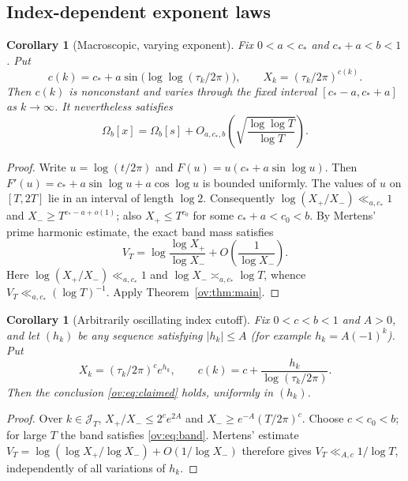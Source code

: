 \documentclass[11pt,reqno]{amsart}
\numberwithin{equation}{section}
\newtheorem{corollary}[theorem]{Corollary}
\begin{document}
\subsection{Index-dependent exponent laws}
\begin{corollary}[Macroscopic, varying exponent]\label{ov:cor:osc}
Fix $0<a<c_*$ and $c_*+a<b<1$. Put
\begin{equation}
\boxed{c(k)=c_*+a\sin\bigl(\log\log(\tau_k/2\pi)\bigr),\qquad
X_k=(\tau_k/2\pi)^{c(k)}.}
\label{ov:eq:osc}
\end{equation}
Then $c(k)$ is nonconstant and varies through the fixed interval $[c_*-a,c_*+a]$ as $k\to\infty$. It nevertheless satisfies
\begin{equation}
\Omega_b[x]=\Omega_b[s]
+O_{a,c_*,b}\left(\sqrt{\frac{\log\log T}{\log T}}\right).
\end{equation}
\end{corollary}
\begin{proof}
Write $u=\log(t/2\pi)$ and $F(u)=u(c_*+a\sin\log u)$. Then
$F'(u)=c_*+a\sin\log u+a\cos\log u$ is bounded uniformly. The values of $u$ on $[T,2T]$ lie in an interval of length $\log2$. Consequently
$\log(X_+/X_-)\ll_{a,c_*}1$ and $X_-\ge T^{c_*-a+o(1)}$; also $X_+\le T^{c_0}$ for some $c_*+a<c_0<b$. By Mertens' prime harmonic estimate, the exact band mass satisfies
\[
 V_T=\log\frac{\log X_+}{\log X_-}
       +O\!\left(\frac1{\log X_-}\right).
\]
Here $\log(X_+/X_-)\ll_{a,c_*}1$ and
$\log X_-\asymp_{a,c_*}\log T$, whence
$V_T\ll_{a,c_*}(\log T)^{-1}$. Apply Theorem~\ref{ov:thm:main}.
\end{proof}

\begin{corollary}[Arbitrarily oscillating index cutoff]\label{ov:cor:wild}
Fix $0<c<b<1$ and $A>0$, and let $(h_k)$ be \emph{any} sequence satisfying $|h_k|\le A$ (for example $h_k=A(-1)^k$). Put
\begin{equation}
\boxed{X_k=(\tau_k/2\pi)^c e^{h_k},\qquad
c(k)=c+\frac{h_k}{\log(\tau_k/2\pi)}.}
\end{equation}
Then the conclusion \eqref{ov:eq:claimed} holds, uniformly in $(h_k)$.
\end{corollary}
\begin{proof}
Over $k\in\mathcal J_T$, $X_+/X_-\le2^ce^{2A}$ and $X_-\ge e^{-A}(T/2\pi)^c$. Choose $c<c_0<b$; for large $T$ the band satisfies \eqref{ov:eq:band}. Mertens' estimate
$V_T=\log(\log X_+/\log X_-)+O(1/\log X_-)$
therefore gives $V_T\ll_{A,c}1/\log T$, independently of
all variations of $h_k$.
\end{proof}
\end{document}
